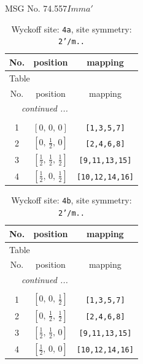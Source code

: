 \documentclass[fleqn,8pt]{jsarticle}
\begin{document}
\setcounter{MaxMatrixCols}{32}

\renewcommand{\tablename}{Table~}
\renewcommand{\figurename}{Figure~}
\begin{center}
\LARGE
MSG No. 74.557\quad$Imma'$
\end{center}
\renewcommand{\arraystretch}{1.2}
\begin{longtable}{ccc}
\caption{Wyckoff site: {\tt 4a}, site symmetry: {\tt 2'/m..}}
 \\
 \hline \hline
No. & position & mapping \\ \hline \endfirsthead

\multicolumn{2}{l}{\tablename\ \thetable{}} \\
 \hline \hline
No. & position & mapping \\ \hline \endhead

 \hline \hline
\multicolumn{2}{r}{\footnotesize\it continued ...} \\ \endfoot

 \hline \hline
\multicolumn{2}{r}{} \\ \endlastfoot

1 & $\left[ 0,\, 0,\, 0 \right]$ & {\tt [1,3,5,7]} \\ \hline
2 & $\left[ 0,\, \frac{1}{2},\, 0 \right]$ & {\tt [2,4,6,8]} \\ \hline
3 & $\left[ \frac{1}{2},\, \frac{1}{2},\, \frac{1}{2} \right]$ & {\tt [9,11,13,15]} \\ \hline
4 & $\left[ \frac{1}{2},\, 0,\, \frac{1}{2} \right]$ & {\tt [10,12,14,16]} \\
\end{longtable}
\renewcommand{\arraystretch}{1.2}
\begin{longtable}{ccc}
\caption{Wyckoff site: {\tt 4b}, site symmetry: {\tt 2'/m..}}
 \\
 \hline \hline
No. & position & mapping \\ \hline \endfirsthead

\multicolumn{2}{l}{\tablename\ \thetable{}} \\
 \hline \hline
No. & position & mapping \\ \hline \endhead

 \hline \hline
\multicolumn{2}{r}{\footnotesize\it continued ...} \\ \endfoot

 \hline \hline
\multicolumn{2}{r}{} \\ \endlastfoot

1 & $\left[ 0,\, 0,\, \frac{1}{2} \right]$ & {\tt [1,3,5,7]} \\ \hline
2 & $\left[ 0,\, \frac{1}{2},\, \frac{1}{2} \right]$ & {\tt [2,4,6,8]} \\ \hline
3 & $\left[ \frac{1}{2},\, \frac{1}{2},\, 0 \right]$ & {\tt [9,11,13,15]} \\ \hline
4 & $\left[ \frac{1}{2},\, 0,\, 0 \right]$ & {\tt [10,12,14,16]} \\
\end{longtable}
\end{document}
